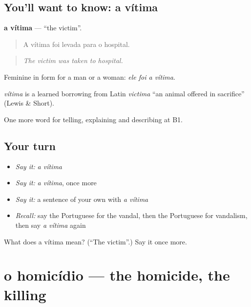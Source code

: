 \subsection*{You'll want to know: a vítima}
\textbf{a vítima} — \textquotedblleft{}the victim\textquotedblright{}.

\begin{quote}
A vítima foi levada para o hospital.
\end{quote}

\begin{quote}
\emph{The victim was taken to hospital.}
\end{quote}

Feminine in form for a man or a woman: \emph{ele foi a vítima}.

\begin{cousinweb}
\emph{vítima} is a learned borrowing from Latin \emph{victima} \textquotedblleft{}an animal offered in sacrifice\textquotedblright{} (Lewis \& Short).
\end{cousinweb}

\begin{grammarlens}[title={What you've built}]
One more word for telling, explaining and describing at B1.
\end{grammarlens}

\subsection*{Your turn}
\begin{itemize}
\raggedright
  \item \emph{Say it:} \emph{a vítima}
  \item \emph{Say it:} \emph{a vítima}, once more
  \item \emph{Say it:} a sentence of your own with \emph{a vítima}
  \item \emph{Recall:} say the Portuguese for the vandal, then the Portuguese for vandalism, then say \emph{a vítima} again
\end{itemize}

\begin{tcolorbox}[breakable,colback=teal!4,colframe=teal!35!black,title={Before you move on}]
What does a vítima mean? (\textquotedblleft{}The victim\textquotedblright{}.) Say it once more.
\end{tcolorbox}
\section[o homicídio]{o homicídio — the homicide, the killing}

